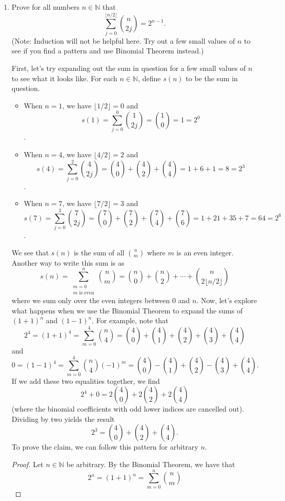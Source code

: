 \documentclass[11pt]{article}
\def\naturals{\mathbb{N}}
\begin{document}
 
\begin{enumerate}%
 \item Prove for all numbers $n\in\naturals$ that 
\[
 \sum_{j=0}^{\lfloor n/2\rfloor} \binom{n}{2j} = 2^{n-1}.
\]
(Note: Induction will not be helpful here. Try out a few small values of $n$ to see if you find a pattern and use Binomial Theorem instead.)

\begin{Solution}
First, let's try expanding out the sum in question for a few small values of $n$ to see what it looks like. For each $n\in\naturals$, define $s(n)$ to be the sum in question. 
 \begin{itemize}
  \item When $n=1$, we have $\lfloor 1/2\rfloor = 0$ and 
 \[
  s(1) = \sum_{j=0}^0 \binom{1}{2j} = \binom{1}{0} = 1 = 2^0 
 \].
 \item When $n=4$, we have $\lfloor 4/2\rfloor = 2$ and 
 \[
  s(4)= \sum_{j=0}^2 \binom{4}{2j} = \binom{4}{0} + \binom{4}{2} + \binom{4}{4} = 1 +6 + 1= 8=2^3 
 \].
  \item When $n=7$, we have $\lfloor 7/2\rfloor = 3$ and 
 \[
  s(7)= \sum_{j=0}^3 \binom{7}{2j} = \binom{7}{0} + \binom{7}{2} + \binom{7}{4} + \binom{7}{6}= 1 +21 + 35 + 7= 64=2^6 
 \].
\end{itemize}
We see that $s(n)$ is the sum of all $\binom{n}{m}$ where $m$ is an even integer. Another way to write this sum is as
\[
 s(n) = \sum_{\substack{m=0\\m\text{ is even}}}^n \binom{n}{m} = \binom{n}{0} + \binom{n}{2} + \cdots + \binom{n}{2\lfloor n/2\rfloor}
\]
where we sum only over the even integers between $0$ and $n$. Now, let's explore what happens when we use the Binomial Theorem to expand the sums of $(1+1)^n$ and $(1-1)^n$. For example, note that 
\[
 2^4 = (1+1)^4 = \sum_{m=0}^4\binom{n}{4} = \binom{4}{0} + \binom{4}{1} +\binom{4}{2} +\binom{4}{3} +\binom{4}{4}
\]
and 
\[
 0 = (1-1)^4 = \sum_{m=0}^4\binom{n}{4}(-1)^m = \binom{4}{0} - \binom{4}{1} +\binom{4}{2} -\binom{4}{3} +\binom{4}{4}.
\]
If we add these two equalities together, we find
\[
 2^4 + 0 = 2\binom{4}{0} + 2\binom{4}{2} + 2\binom{4}{4}
\]
(where the binomial coefficients with odd lower indices are cancelled out). Dividing by two yields the result
\[
  2^3 = \binom{4}{0} + \binom{4}{2} + \binom{4}{4}.
\]
To prove the claim, we can follow this pattern for arbitrary $n$.
\begin{proof}
 Let $n\in\naturals$ be arbitrary. By the Binomial Theorem, we have that
 \[
  2^n = (1+1)^n = \sum_{m=0}^n \binom{n}{m} 
\]
\end{proof}
\end{Solution}
\end{enumerate}
\end{document}
